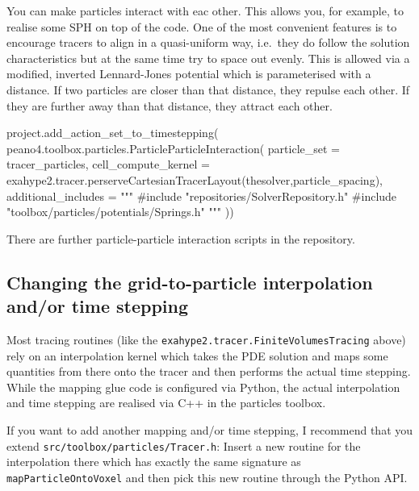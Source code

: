 You can make particles interact with eac other. 
This allows you, for example, to
realise some SPH on top of the code.
One of the most convenient features is to encourage tracers to align in a
quasi-uniform way, i.e.~they do follow the solution characteristics but at the
same time try to space out evenly.
This is allowed via a modified, inverted Lennard-Jones potential
which is parameterised with a distance.
If two particles are closer than that distance, they repulse each other. 
If they are further away than that distance, they attract each other.

\begin{code}
project.add_action_set_to_timestepping( peano4.toolbox.particles.ParticleParticleInteraction(
  particle_set = tracer_particles,
  cell_compute_kernel = exahype2.tracer.perserveCartesianTracerLayout(thesolver,particle_spacing),
  additional_includes = """
#include "repositories/SolverRepository.h"
#include "toolbox/particles/potentials/Springs.h"
"""
))
\end{code}

\noindent
There are further particle-particle interaction scripts in the repository.


\subsection{Changing the grid-to-particle interpolation and/or time stepping}

Most tracing routines (like the \texttt{exahype2.tracer.FiniteVolumesTracing}
above) rely on an interpolation kernel which takes the PDE solution and maps 
some quantities from there onto the tracer and then performs the actual time
stepping.
While the mapping glue code is configured via Python, the actual interpolation
and time stepping are realised via C++ in the particles toolbox.


If you want to add another mapping and/or time stepping, I recommend that you 
extend \texttt{src/toolbox/particles/Tracer.h}:
Insert a new routine for the interpolation there which has exactly the same
signature as \texttt{mapParticleOntoVoxel} and then pick this new routine
through the Python API.




 


